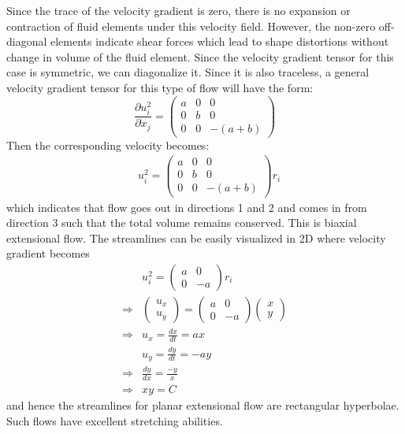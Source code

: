 \documentclass[11pt,a4paper]{article}
\newcommand{\pd}[2]{\frac{\partial #1}{\partial #2}}
\newcommand{\1}{\vect{1}}
\newcommand{\RA}{\Rightarrow}
\begin{document}
\begin{itemize}
Since the trace of the velocity gradient is zero, there is no expansion or contraction of fluid elements under this velocity field. However, the non-zero off-diagonal elements indicate shear forces which lead to shape distortions without change in volume of the fluid element.
Since the velocity gradient tensor for this case is symmetric, we can diagonalize it. Since it is also traceless, a general velocity gradient tensor for this type of flow will have the form:
$$
\pd{u^2_i}{x_j} = 
\begin{pmatrix}
a & 0 & 0 \\
0 & b & 0 \\
0 & 0 & -(a+b)
\end{pmatrix}
$$
Then the  corresponding velocity becomes:
\begin{align*}
& u^2_i = 
\begin{pmatrix}
a & 0 & 0 \\
0 & b & 0 \\
0 & 0 & -(a+b)
\end{pmatrix}
r_i
\end{align*}
which indicates that flow goes out in directions 1 and 2 and comes in from direction 3 such that the total volume remains conserved. This is biaxial extensional flow. The streamlines can be easily visualized in 2D where velocity gradient becomes
\begin{align*}
& u^2_i = 
\begin{pmatrix}
a & 0\\
0 & -a
\end{pmatrix}r_i\\
\RA& {\begin{pmatrix}
u_x\\
u_y 
\end{pmatrix}} = {\begin{pmatrix}
a & 0\\
0 & -a
\end{pmatrix}}{\begin{pmatrix}
x\\
y 
\end{pmatrix}}\\
\RA& u_x = \frac{dx}{dt} = ax\\
& u_y = \frac{dy}{dt} = -ay\\
\RA& \frac{dy}{dx} = \frac{-y}{x}\\
\RA& xy = C
\end{align*}
and hence the streamlines for planar extensional flow are rectangular hyperbolae. Such flows have excellent stretching abilities.


\end{itemize}
\end{document}
